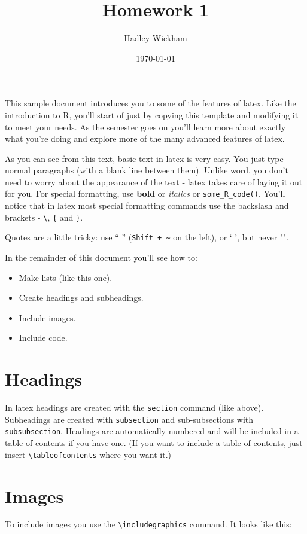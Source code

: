 \documentclass[oneside]{article}
\title{Homework 1}
\author{Hadley Wickham}
\date{\today}
\begin{document}
\maketitle 

This sample document introduces you to some of the features of latex.  Like the introduction to R, you'll start of just by copying this template and modifying it to meet your needs.  As the semester goes on you'll learn more about exactly what you're doing and explore more of the many advanced features of latex.  

As you can see from this text, basic text in latex is very easy.  You just type normal paragraphs (with a blank line between them).  Unlike word, you don't need to worry about the appearance of the text - latex takes care of laying it out for you.  For special formatting, use {\bf bold} or {\it italics} or \verb|some_R_code()|.  You'll notice that in latex most special formatting commands use the backslash and brackets - \verb|\|, \verb|{| and \verb|}|.  

Quotes are a little tricky: use `` '' (\verb|Shift + ~| on the left), or ` ', but never "".  

In the remainder of this document you'll see how to:

\begin{itemize}
  \item Make lists (like this one).
  \item Create headings and subheadings.
  \item Include images.
  \item Include code.
\end{itemize}

\section{Headings}

In latex headings are created with the {\tt section} command (like above).  Subheadings are created with {\tt subsection} and sub-subsections with {\tt subsubsection}.  Headings are automatically numbered and will be included in a table of contents if you have one.  (If you want to include a table of contents, just insert \verb|\tableofcontents| where you want it.)

\section{Images}

To include images you use the \verb|\includegraphics| command.  It looks like this:
\end{document}
